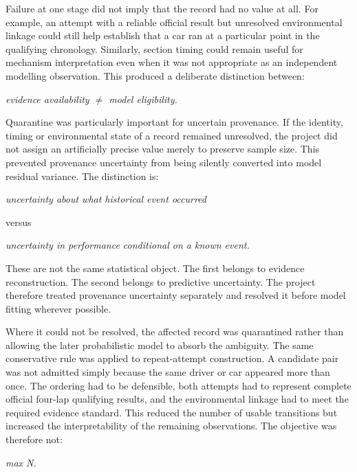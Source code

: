 Failure at one stage did not imply that the record had no value at all. For example, an attempt with a reliable official result but unresolved environmental linkage could still help establish that a car ran at a particular point in the qualifying chronology. Similarly, section timing could remain useful for mechanism interpretation even when it was not appropriate as an independent modelling observation. This produced a deliberate distinction between:

\begin{center}\textit{evidence availability \ensuremath{\neq} model eligibility.}\end{center}

Quarantine was particularly important for uncertain provenance. If the identity, timing or environmental state of a record remained unresolved, the project did not assign an artificially precise value merely to preserve sample size. This prevented provenance uncertainty from being silently converted into model residual variance. The distinction is:

\begin{center}\textit{uncertainty about what historical event occurred}\end{center}

versus

\begin{center}\textit{uncertainty in performance conditional on a known event.}\end{center}

These are not the same statistical object. The first belongs to evidence reconstruction. The second belongs to predictive uncertainty. The project therefore treated provenance uncertainty separately and resolved it before model fitting wherever possible.

Where it could not be resolved, the affected record was quarantined rather than allowing the later probabilistic model to absorb the ambiguity. The same conservative rule was applied to repeat-attempt construction. A candidate pair was not admitted simply because the same driver or car appeared more than once. The ordering had to be defensible, both attempts had to represent complete official four-lap qualifying results, and the environmental linkage had to meet the required evidence standard. This reduced the number of usable transitions but increased the interpretability of the remaining observations. The objective was therefore not:

\begin{center}\textit{max N.}\end{center}

